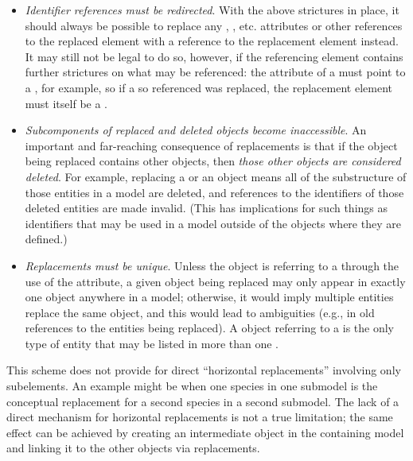 \begin{itemize}
\item \emph{Identifier references must be redirected}.  With the above 
  strictures in place, it should always be possible to replace any 
  , , etc. attributes or other references
  to the replaced element with a reference to the replacement element
  instead.  It may still not be legal to do so, however, if the 
  referencing element contains further strictures on what may be referenced:
  the  attribute of a \Species must point to a 
  \Compartment, for example, so if a \Compartment so referenced
  was replaced, the replacement element must itself be a \Compartment.
  
\item \emph{Subcomponents of replaced and deleted objects become inaccessible}.  An
  important and far-reaching consequence of replacements is that if the
  object being replaced contains other objects, then \emph{those other
    objects are considered deleted}.  For example, replacing a \Reaction
  or an \Event object means all of the substructure of those entities in
  a model are deleted, and references to the identifiers of those
  deleted entities are made invalid.  (This has implications for such
  things as \SpeciesReference identifiers that may be used in a model
  outside of the \Reaction objects where they are defined.)

\item \emph{Replacements must be unique}.  Unless the \ReplacedElement 
  object is referring to a \Deletion through the use of the 
   attribute, a given object
  being replaced may only appear in exactly one \ReplacedElement object
  anywhere in a model; otherwise, it would imply multiple entities
  replace the same object, and this would lead to ambiguities (e.g., in
  old references to the entities being replaced).  A \ReplacedElement
  object referring to a \Deletion is the only type of entity
  that may be listed in more than one \ListOfReplacedElements.

\end{itemize}

This scheme does not provide for direct ``horizontal replacements''
involving only subelements.  An example might be when one species in one
submodel is the conceptual replacement for a second species in a second
submodel.  The lack of a direct mechanism for horizontal replacements is
not a true limitation; the same effect can be achieved by creating an
intermediate object in the containing model and linking it to the other
objects via replacements.

